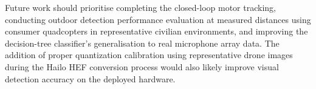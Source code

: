 Future work should prioritise completing the closed-loop motor 
tracking, conducting outdoor detection performance evaluation 
at measured distances using consumer quadcopters in 
representative civilian environments, and improving the 
decision-tree classifier's generalisation to real microphone 
array data. The addition of proper quantization calibration 
using representative drone images during the Hailo HEF 
conversion process would also likely improve visual detection 
accuracy on the deployed hardware.